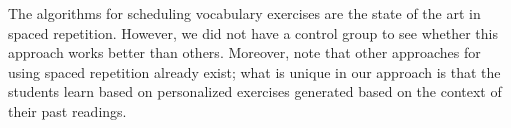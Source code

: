 
The algorithms for scheduling vocabulary exercises are the state of the art in spaced repetition. However, we did not have a control group to see whether this approach works better than others. Moreover, note that other approaches for using spaced repetition already exist; what is unique in our approach is that the students learn based on personalized exercises generated based on the context of their past readings.







